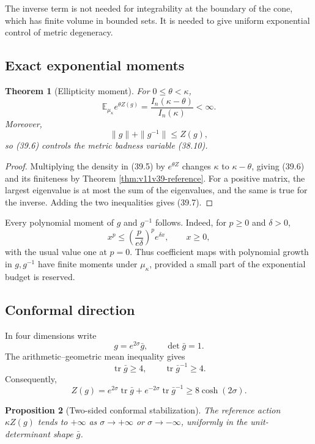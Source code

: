 \documentclass[11pt]{article}
\newtheorem{theorem}{Theorem}[section]
\newtheorem{proposition}[theorem]{Proposition}
\begin{document}
The inverse term is not needed for integrability at the boundary of the
cone, which has finite volume in bounded sets.  It is needed to give
uniform exponential control of metric degeneracy.

\subsection{Exact exponential moments}

\begin{theorem}[Ellipticity moment]
\label{thm:v11v39-moment}
For \(0\leq\theta<\kappa\),
\[
 \mathbb E_{\mu_\kappa}e^{\theta Z(g)}
 =
 \frac{I_n(\kappa-\theta)}{I_n(\kappa)}
 <\infty.
 \tag{39.6}
\]
Moreover,
\[
 \|g\|+\|g^{-1}\|\leq Z(g),
 \tag{39.7}
\]
so (39.6) controls the metric badness variable (38.10).
\end{theorem}

\begin{proof}
Multiplying the density in (39.5) by \(e^{\theta Z}\) changes
\(\kappa\) to \(\kappa-\theta\), giving (39.6) and its finiteness by
Theorem \ref{thm:v11v39-reference}.  For a positive matrix, the largest
eigenvalue is at most the sum of the eigenvalues, and the same is true
for the inverse.  Adding the two inequalities gives (39.7).
\end{proof}

Every polynomial moment of \(g\) and \(g^{-1}\) follows.  Indeed, for
\(p\geq0\) and \(\delta>0\),
\[
 x^p\leq
 \left(\frac{p}{e\delta}\right)^p e^{\delta x},
 \qquad x\geq0,
 \tag{39.8}
\]
with the usual value one at \(p=0\).  Thus coefficient maps with
polynomial growth in \(g,g^{-1}\) have finite moments under
\(\mu_\kappa\), provided a small part of the exponential budget is
reserved.

\subsection{Conformal direction}

In four dimensions write
\[
 g=e^{2\sigma}\bar g,\qquad\det\bar g=1.
 \tag{39.9}
\]
The arithmetic--geometric mean inequality gives
\[
 \operatorname{tr}\bar g\geq4,\qquad
 \operatorname{tr}\bar g^{-1}\geq4.
 \tag{39.10}
\]
Consequently,
\[
 Z(g)
 =
 e^{2\sigma}\operatorname{tr}\bar g
 +e^{-2\sigma}\operatorname{tr}\bar g^{-1}
 \geq
 8\cosh(2\sigma).
 \tag{39.11}
\]

\begin{proposition}[Two-sided conformal stabilization]
\label{prop:v11v39-conformal}
The reference action \(\kappa Z(g)\) tends to \(+\infty\) as
\(\sigma\to+\infty\) or \(\sigma\to-\infty\), uniformly in the
unit-determinant shape \(\bar g\).
\end{proposition}
\end{document}
